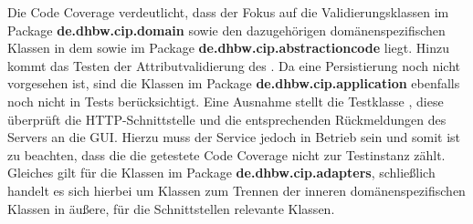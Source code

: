 Die Code Coverage verdeutlicht, dass der Fokus auf die Validierungsklassen im Package \textbf{de.dhbw.cip.domain} sowie den dazugehörigen domänenspezifischen Klassen in dem sowie im Package \textbf{de.dhbw.cip.abstractioncode} liegt. 
Hinzu kommt das Testen der Attributvalidierung des \href{https://github.com/lucasmerkel/dhbw-advancedswe-programmentwurf/blob/5764d7da4cfd0562ed8e96128e92f85c30b7309d/swe_programmentwurf/consumergoods-inventory-planner/3-cip-domain/src/main/java/de/dhbw/cip/domain/ConsumerGoods.java#L71}{}.
Da eine Persistierung noch nicht vorgesehen ist, sind die Klassen im Package \textbf{de.dhbw.cip.application} ebenfalls noch nicht in Tests berücksichtigt.
Eine Ausnahme stellt die Testklasse \href{https://github.com/lucasmerkel/dhbw-advancedswe-programmentwurf/blob/5764d7da4cfd0562ed8e96128e92f85c30b7309d/swe_programmentwurf/consumergoods-inventory-planner/0-cip-plugins/src/test/java/de/dhbw/cip/ConsumerGoodsGuiControllerTest.java}{}, diese überprüft die \ac{HTTP}-Schnittstelle und die entsprechenden Rückmeldungen des Servers an die GUI. 
Hierzu muss der Service jedoch in Betrieb sein und somit ist zu beachten, dass die die getestete Code Coverage nicht zur Testinstanz zählt.
Gleiches gilt für die Klassen im Package \textbf{de.dhbw.cip.adapters}, schließlich handelt es sich hierbei um Klassen zum Trennen der inneren domänenspezifischen Klassen in äußere, für die Schnittstellen relevante Klassen.

